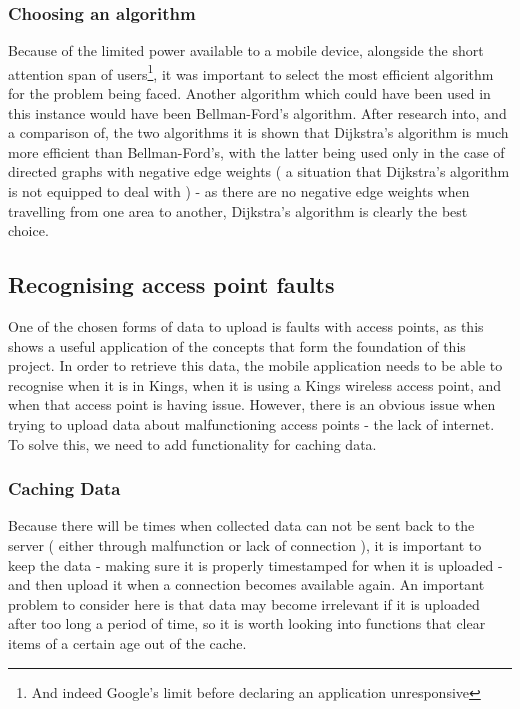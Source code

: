 \documentclass[11pt]{informatics-report}
\begin{document}
\subsubsection{Choosing an algorithm}

Because of the limited power available to a mobile device, alongside the short attention span of users\footnote{And indeed Google's limit before declaring an application unresponsive}, it was important to select the most efficient algorithm for the problem being faced. Another algorithm which could have been used in this instance would have been Bellman-Ford's algorithm. After research into, and a comparison of, the two algorithms it is shown that Dijkstra's algorithm is much more efficient than Bellman-Ford's\cite{thippeswamystudy}, with the latter being used only in the case of directed graphs with negative edge weights ( a situation that Dijkstra's algorithm is not equipped to deal with ) - as there are no negative edge weights when travelling from one area to another, Dijkstra's algorithm is clearly the best choice.

\subsection{Recognising access point faults}

One of the chosen forms of data to upload is faults with access points, as this shows a useful application of the concepts that form the foundation of this project. In order to retrieve this data, the mobile application needs to be able to recognise when it is in Kings, when it is using a Kings wireless access point, and when that access point is having issue. However, there is an obvious issue when trying to upload data about malfunctioning access points - the lack of internet. To solve this, we need to add functionality for caching data.

\subsubsection{Caching Data}

Because there will be times when collected data can not be sent back to the server ( either through malfunction or lack of connection ), it is important to keep the data - making sure it is properly timestamped for when it is uploaded - and then upload it when a connection becomes available again. An important problem to consider here is that data may become irrelevant if it is uploaded after too long a period of time, so it is worth looking into functions that clear items of a certain age out of the cache. 
\end{document}
